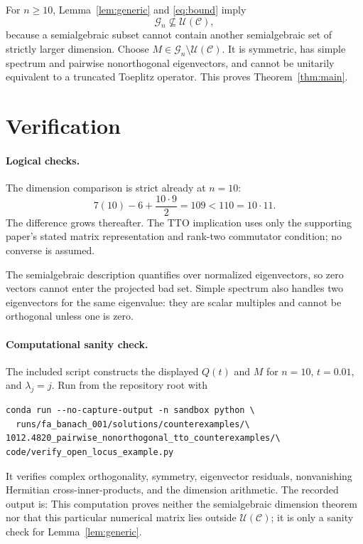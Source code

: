 \documentclass[11pt]{article}
\newcommand{\Ucal}{\mathcal{U}}
\newcommand{\Ccal}{\mathcal{C}}
\begin{document}
For $n\geq10$, Lemma~\ref{lem:generic} and \eqref{eq:bound} imply
\[
\mathcal G_n\not\subseteq\Ucal(\Ccal),
\]
because a semialgebraic subset cannot contain another semialgebraic set of
strictly larger dimension.  Choose
$M\in\mathcal G_n\setminus\Ucal(\Ccal)$.  It is symmetric, has simple
spectrum and pairwise nonorthogonal eigenvectors, and cannot be unitarily
equivalent to a truncated Toeplitz operator.  This proves
Theorem~\ref{thm:main}.

\section{Verification}

\paragraph{Logical checks.}
The dimension comparison is strict already at $n=10$:
\[
7(10)-6+\frac{10\cdot9}{2}=109<110=10\cdot11.
\]
The difference grows thereafter.  The TTO implication uses only the
supporting paper's stated matrix representation and rank-two commutator
condition; no converse is assumed.

The semialgebraic description quantifies over normalized eigenvectors, so
zero vectors cannot enter the projected bad set.  Simple spectrum also
handles two eigenvectors for the same eigenvalue: they are scalar multiples
and cannot be orthogonal unless one is zero.

\paragraph{Computational sanity check.}
The included script constructs the displayed $Q(t)$ and $M$ for $n=10$,
$t=0.01$, and $\lambda_j=j$.  Run from the repository root with
\begin{Verbatim}[fontsize=\small]
conda run --no-capture-output -n sandbox python \
  runs/fa_banach_001/solutions/counterexamples/\
1012.4820_pairwise_nonorthogonal_tto_counterexamples/\
code/verify_open_locus_example.py
\end{Verbatim}
It verifies complex orthogonality, symmetry, eigenvector residuals,
nonvanishing Hermitian cross-inner-products, and the dimension arithmetic.
The recorded output is:
\VerbatimInput[fontsize=\small]{verification_output.txt}
This computation proves neither the semialgebraic dimension theorem nor that
this particular numerical matrix lies outside $\Ucal(\Ccal)$; it is only a
sanity check for Lemma~\ref{lem:generic}.
\end{document}
